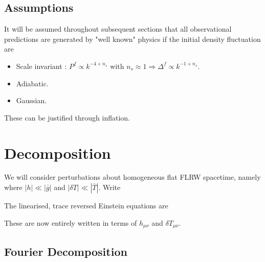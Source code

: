 \documentclass{article}
\begin{document}
\subsection{Assumptions}
It will be assumed throughout subsequent sections that all observational predictions are generated by "well known" physics if the initial density fluctuation are 
\begin{itemize}
    \item Scale invariant : $P^f \propto k^{-4 + n_s}$ with $n_s \approx 1 \Rightarrow \Delta^f \propto k^{-1+n_s}$. 
    \item Adiabatic. 
    \item Gaussian.
\end{itemize}
These can be justified through inflation. 

\section{Decomposition}
We will consider perturbations about homogeneous flat FLRW spacetime, namely 
where $|h| \ll |\bar{g}|$ and $|\delta T| \ll |\bar{T}|$. Write 

\begin{theorem}
The linearised, trace reversed Einstein equations are 
\end{theorem}

These are now entirely written in terms of $h_{\mu\nu}$ and $\delta T_{\mu\nu}$. 
\subsection{Fourier Decomposition}
\end{document}
